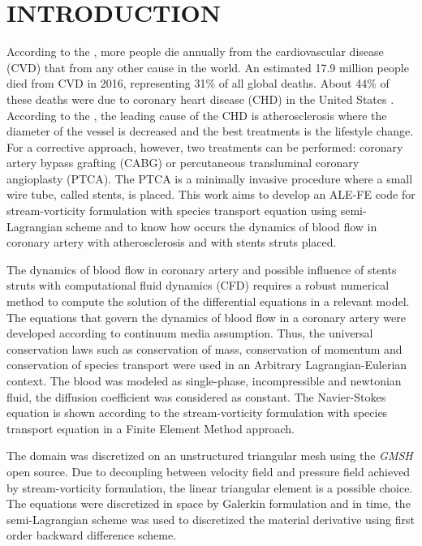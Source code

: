 \documentclass[10pt,fleqn,a4paper,twoside]{article}
\begin{document}
\section{INTRODUCTION}

According to the \citet{oms2017}, more people die annually from the cardiovascular disease (CVD) that from any other cause in the world. An estimated 17.9 million people died from CVD in 2016, representing 31\% of all global deaths. 
About 44\% of these deaths were due to coronary heart disease (CHD) in the United States \citep{chd2018}.
According to the \citet{atherosclerosis}, the leading cause of the CHD is atherosclerosis where the diameter of the vessel is decreased and the best treatments is the lifestyle change. For a corrective approach, however, two treatments can be performed: coronary artery bypass grafting (CABG) or percutaneous transluminal coronary angioplasty (PTCA). The PTCA is a minimally invasive procedure where a small wire tube, called stents, is placed. 
This work aims to develop an ALE-FE code for stream-vorticity formulation with species transport equation using semi-Lagrangian scheme and to know how occurs the dynamics of blood flow in coronary artery with atherosclerosis and with stents struts placed.

\smallskip
The dynamics of blood flow in coronary artery and possible influence of stents struts with computational fluid dynamics (CFD) requires a robust numerical method to compute the solution of the differential equations in a relevant model. 
The equations that govern the dynamics of blood flow in a coronary artery were developed according to continuum media assumption. Thus, the universal conservation laws such as conservation of mass, conservation of momentum and conservation of species transport were used in an Arbitrary Lagrangian-Eulerian context. 
The blood was modeled as single-phase, incompressible and newtonian fluid, the diffusion coefficient was considered as constant. 
The Navier-Stokes equation is shown according to the stream-vorticity formulation with species transport equation in a Finite Element Method approach.

\smallskip
The domain was discretized on an unstructured triangular mesh using the \textit{GMSH} open source. Due to decoupling between velocity field and pressure field achieved by stream-vorticity formulation, the linear triangular element is a possible choice.
The equations were discretized in space by Galerkin formulation and in time, the semi-Lagrangian scheme was used to discretized the material derivative using first order backward difference scheme.
\end{document}

